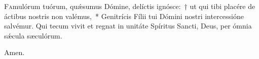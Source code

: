 \lettrine{F}{a}mulórum tuórum, quǽsumus Dómine, delí\-ctis ignósce:~† ut qui tibi placére de á\-ctibus nostris non valémus,~* Genitrícis Fílii tui Dómini nostri intercessióne salvémur. Qui tecum vivit et regnat in unitáte Spíritus San\-cti, Deus, per ó\-mnia sǽcula sæculórum.

\rr Amen.